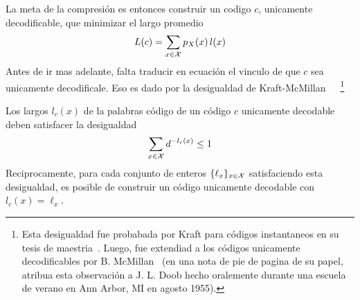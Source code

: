 La  meta de  la compresi\'on  es entonces  construir un  codigo  $c$, unicamente
decodificable, que minimizar el largo promedio
%
\[
L(c) = \sum_{x \in \mathcal{X}} p_X(x) \, l(x)
\]
%
Antes de ir mas adelante, falta traducir en ecuaci\'on el vinculo de que $c$ sea
unicamente    decodificale.    Eso    es    dado   por    la   desigualdad    de
Kraft-McMillan~~\cite{Kra49,   McM56,   Kar61}~\footnote{Esta  desigualdad   fue
  probabada   por   Kraft  para   c\'odigos   instantaneos   en   su  tesis   de
  maestria~\cite{Kra49}.  Luego,  fue   extendiad  a  los  c\'odigos  unicamente
  decodificables por B.  McMillan~\cite{McM56} (en una nota de  pie de pagina de
  su papel,  atribua esta observaci\'on a  J.  L. Doob  hecho oralemente durante
  una escuela de verano en Ann Arbor, MI en agosto 1955).}
%
\begin{teorema}
  Los  largos $l_c(x)$ de  la palabras  c\'odigo de  un c\'odigo  $c$ unicamente
  decodable deben satisfacer la desigualdad
  \[
  \sum_{x \in \mathcal{X}} d^{-l_c(x)} \le 1
  \]
  Reciprocamente,  para cada  conjunto  de  enteros $\{  \ell_x  \}_{x \in  \mathcal{X}}$
  satisfaciendo esta desigualdad, es posible de construir un c\'odigo unicamente
  decodable con $l_c(x) = \ell_x$.
\end{teorema}
%

